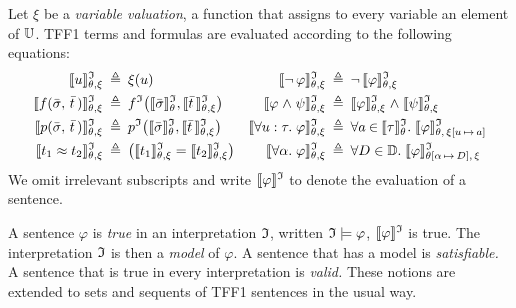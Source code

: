 Let $\xi$ be a {\em variable valuation}, a function that assigns
to every variable an element of $\univ$. TFF1 terms
and formulas are evaluated according to the following equations:
\begin{align*}
\eval{u} &\eqdef \xi(u) &
  \eval{\lnot\, \varphi} &\eqdef \lnot\, \eval{\varphi} \\
\eval{f(\bar{\sigma},\,\bar{t}\,)} &\eqdef f^\cI\bigl(\evalT{\bar{\sigma}},\eval{\bar{t}\,}\bigr) &
  \eval{\varphi \rand \psi} &\eqdef \eval{\varphi} \rand \eval{\psi} \\
\eval{p(\bar{\sigma},\,\bar{t}\,)} &\eqdef p^\cI\bigl(\evalT{\bar{\sigma}},\eval{\bar{t}\,}\bigr) &
  \eval{\forall u \ty \tau .\; \varphi} &\eqdef \forall {a \mathbin\in \evalT{\tau}} .\;
  \smash{\evalG{\varphi}_{\theta,\,\xi[u\,\mapsto\,a]}} \\
\eval{t_1 \eq t_2} &\eqdef \bigl(\eval{t_1} = \eval{t_2}\bigr) &
  \eval{\forall \alpha .\; \varphi} &\eqdef \forall {D \in \sorts} .\;
  \smash{\evalG{\varphi}_{\theta[\alpha\,\mapsto\,D],\,\xi}}
\end{align*}
We omit irrelevant subscripts and write
$\evalG{\varphi}$ to denote the evaluation of a sentence.

A sentence $\varphi$ is {\em true} in an interpretation $\cI$,
written $\cI \models \varphi$, \iff{} $\evalG{\varphi}$ is true.
The interpretation $\cI$ is then a {\em model\/} of $\varphi$.
A sentence that has a model is {\em satisfiable.}
A sentence that is true in every interpretation is {\em valid.}
These notions are extended to sets and sequents of TFF1 sentences in
the usual way.
